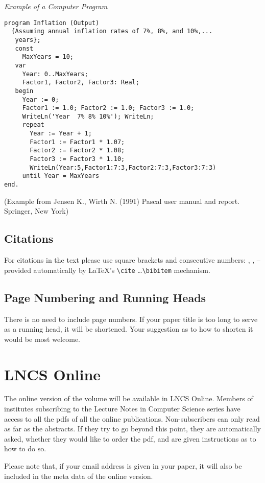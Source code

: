 \documentclass[runningheads,a4paper]{llncs}
\begin{document}
\medskip

\noindent
{\it Example of a Computer Program}
\begin{verbatim}
program Inflation (Output)
  {Assuming annual inflation rates of 7%, 8%, and 10%,...
   years};
   const
     MaxYears = 10;
   var
     Year: 0..MaxYears;
     Factor1, Factor2, Factor3: Real;
   begin
     Year := 0;
     Factor1 := 1.0; Factor2 := 1.0; Factor3 := 1.0;
     WriteLn('Year  7% 8% 10%'); WriteLn;
     repeat
       Year := Year + 1;
       Factor1 := Factor1 * 1.07;
       Factor2 := Factor2 * 1.08;
       Factor3 := Factor3 * 1.10;
       WriteLn(Year:5,Factor1:7:3,Factor2:7:3,Factor3:7:3)
     until Year = MaxYears
end.
\end{verbatim}
%
\noindent
{\small (Example from Jensen K., Wirth N. (1991) Pascal user manual and
report. Springer, New York)}

\subsection{Citations}

For citations in the text please use
square brackets and consecutive numbers: \cite{jour}, \cite{lncschap},
\cite{proceeding1} -- provided automatically
by \LaTeX 's \verb|\cite| \dots\verb|\bibitem| mechanism.

\subsection{Page Numbering and Running Heads}

There is no need to include page numbers. If your paper title is too
long to serve as a running head, it will be shortened. Your suggestion
as to how to shorten it would be most welcome.

\section{LNCS Online}

The online version of the volume will be available in LNCS Online.
Members of institutes subscribing to the Lecture Notes in Computer
Science series have access to all the pdfs of all the online
publications. Non-subscribers can only read as far as the abstracts. If
they try to go beyond this point, they are automatically asked, whether
they would like to order the pdf, and are given instructions as to how
to do so.

Please note that, if your email address is given in your paper,
it will also be included in the meta data of the online version.
\end{document}
